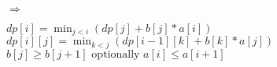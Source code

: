  $\Rightarrow$ 

$ dp[i] = \min_{j < i}(dp[j] + b[j] * a[i]) $ \\
$ dp[i][j] = \min_{k < j}(dp[i - 1][k] + b[k] * a[j]) $ \\
$ b[j] \geq b[j + 1] \text{ optionally } a[i] \leq a[i + 1] $ \\ 